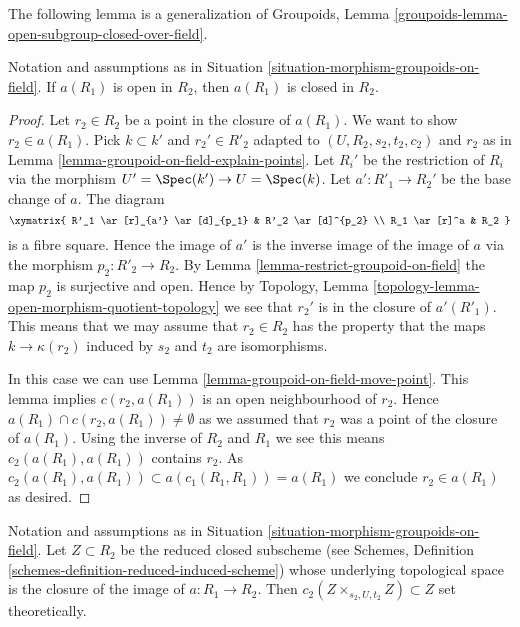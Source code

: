 \noindent
The following lemma is a generalization of
Groupoids, Lemma \ref{groupoids-lemma-open-subgroup-closed-over-field}.

\begin{lemma}
\label{lemma-open-image-is-closed}
Notation and assumptions as in
Situation \ref{situation-morphism-groupoids-on-field}.
If $a(R_1)$ is open in $R_2$, then $a(R_1)$ is closed in $R_2$.
\end{lemma}

\begin{proof}
Let $r_2 \in R_2$ be a point in the closure of $a(R_1)$.
We want to show $r_2 \in a(R_1)$. Pick $k \subset k'$ and
$r_2' \in R'_2$ adapted to $(U, R_2, s_2, t_2, c_2)$ and $r_2$ as in
Lemma \ref{lemma-groupoid-on-field-explain-points}.
Let $R_i'$ be the restriction of $R_i$ via the morphism
$U' = \Spec(k') \to U = \Spec(k)$.
Let $a' : R'_1 \to R_2'$ be the base change of $a$. The diagram
$$
\xymatrix{
R'_1 \ar[r]_{a'} \ar[d]_{p_1} & R'_2 \ar[d]^{p_2} \\
R_1 \ar[r]^a & R_2
}
$$
is a fibre square. Hence the image of $a'$ is the inverse image of
the image of $a$ via the morphism $p_2 : R'_2 \to R_2$. By
Lemma \ref{lemma-restrict-groupoid-on-field}
the map $p_2$ is surjective and open. Hence by
Topology, Lemma \ref{topology-lemma-open-morphism-quotient-topology}
we see that $r_2'$ is in the closure of $a'(R'_1)$.
This means that we may assume that $r_2 \in R_2$ has
the property that the maps $k \to \kappa(r_2)$ induced
by $s_2$ and $t_2$ are isomorphisms.

\medskip\noindent
In this case we can use
Lemma \ref{lemma-groupoid-on-field-move-point}.
This lemma implies $c(r_2, a(R_1))$ is an open neighbourhood of $r_2$.
Hence $a(R_1) \cap c(r_2, a(R_1)) \not = \emptyset$ as we assumed
that $r_2$ was a point of the closure of $a(R_1)$.
Using the inverse of $R_2$ and $R_1$ we see this means
$c_2(a(R_1), a(R_1))$ contains $r_2$.
As $c_2(a(R_1), a(R_1)) \subset a(c_1(R_1, R_1)) = a(R_1)$
we conclude $r_2 \in a(R_1)$ as desired.
\end{proof}

\begin{lemma}
\label{lemma-map-groupoids-on-field-image}
Notation and assumptions as in
Situation \ref{situation-morphism-groupoids-on-field}.
Let $Z \subset R_2$ be the reduced closed subscheme (see
Schemes, Definition \ref{schemes-definition-reduced-induced-scheme})
whose underlying topological space is the closure of the image of
$a : R_1 \to R_2$. Then
$c_2(Z \times_{s_2, U, t_2} Z) \subset Z$
set theoretically.
\end{lemma}

